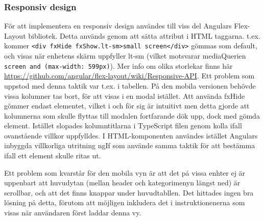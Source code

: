 \documentclass[techdoc/techdock.tex]{subfiles}
\begin{document}
\subsubsection{Responsiv design}
För att implementera en responsiv design användes till viss del Angulars Flex-Layout
bibliotek. Detta används genom att sätta attribut i HTML taggarna. 
t.ex. kommer \texttt{<div fxHide fxShow.lt-sm>small screen</div>} gömmas som default, och visas
när enhetens skärm uppfyller lt-sm (vilket motsvarar mediaQuerien \texttt{screen and (max-width: 599px)}).
Mer info om olika storlekar finns här \url{https://github.com/angular/flex-layout/wiki/Responsive-API}.
Ett problem som uppstod med denna taktik var t.ex. i tabellen. På den mobila versionen 
behövde vissa kolumner tas bort, för att visas i en modal istället. Att använda fxHide gömmer 
endast elementet, vilket i och för sig är intuitivt men detta gjorde att kolumnerna som
skulle flyttas till modalen fortfarande dök upp, dock med gömda element. 
Istället slopades kolumntitlarna i TypeScript filen genom kolla ifall ovanstående villkor 
uppfylldes. I HTML-komponenten användes istället Angulars inbyggda villkorliga utritning
ngIf som använde samma taktik för att bestämma ifall ett element skulle ritas ut.  

Ett problem som kvarstår för den mobila vyn är att det på vissa enhter ej är uppenbart 
att huvudytan (mellan header och kategorimenyn längst ned) är scrollbar, och att det 
finns knappar under huvudtabllen. Det hittades ingen bra lösning på detta, förutom att möjligen
inkludera det i instruktionenerna som visas när användaren först laddar denna vy. 
\end{document}
